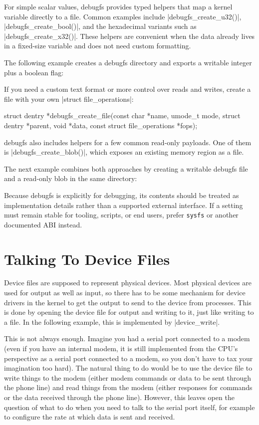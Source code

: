 \documentclass[10pt, oneside]{book}
\begin{document}
For simple scalar values, debugfs provides typed helpers that map a kernel variable directly to a file.
Common examples include \cpp|debugfs_create_u32()|, \cpp|debugfs_create_bool()|, and the hexadecimal variants such as \cpp|debugfs_create_x32()|.
These helpers are convenient when the data already lives in a fixed-size variable and does not need custom formatting.

The following example creates a debugfs directory and exports a writable integer plus a boolean flag:


If you need a custom text format or more control over reads and writes, create a file with your own \cpp|struct file_operations|:

\begin{code}
struct dentry *debugfs_create_file(const char *name, umode_t mode,
                                   struct dentry *parent, void *data,
                                   const struct file_operations *fops);
\end{code}

debugfs also includes helpers for a few common read-only payloads.
One of them is \cpp|debugfs_create_blob()|, which exposes an existing memory region as a file.

The next example combines both approaches by creating a writable debugfs file and a read-only blob in the same directory:


Because debugfs is explicitly for debugging, its contents should be treated as implementation details rather than a supported external interface.
If a setting must remain stable for tooling, scripts, or end users, prefer \verb|sysfs| or another documented ABI instead.

\section{Talking To Device Files}
\label{sec:device_files}
Device files are supposed to represent physical devices.
Most physical devices are used for output as well as input, so there has to be some mechanism for device drivers in the kernel to get the output to send to the device from processes.
This is done by opening the device file for output and writing to it, just like writing to a file.
In the following example, this is implemented by \cpp|device_write|.

This is not always enough.
Imagine you had a serial port connected to a modem (even if you have an internal modem, it is still implemented from the CPU's perspective as a serial port connected to a modem, so you don't have to tax your imagination too hard).
The natural thing to do would be to use the device file to write things to the modem (either modem commands or data to be sent through the phone line) and read things from the modem (either responses for commands or the data received through the phone line).
However, this leaves open the question of what to do when you need to talk to the serial port itself, for example to configure the rate at which data is sent and received.
\end{document}
